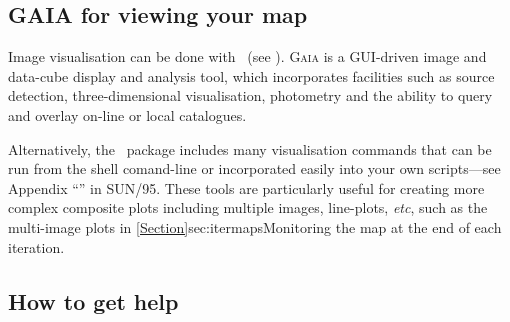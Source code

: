 \subsection{GAIA for viewing your map}

Image visualisation can be done with \gaia\ (see
\gaiasun). \textsc{Gaia} is a GUI-driven image and data-cube display and
analysis tool, which incorporates facilities such as source detection,
three-dimensional visualisation, photometry and the ability to query
and overlay on-line or local catalogues.
\begin{terminalv}
\end{terminalv}

Alternatively, the \Kappa\ package includes many visualisation commands
that can be run from the shell comand-line or incorporated easily into your
own scripts---see Appendix ``''
in SUN/95. These tools are particularly useful for creating more complex
composite plots including multiple images, line-plots, \emph{etc}, such
as the multi-image plots in \cref{Section}{sec:itermaps}{Monitoring the
map at the end of each iteration}.


\subsection{How to get help}
\label{sec:help}

